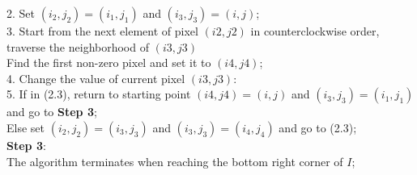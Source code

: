 \begin{algorithm}[htbp]
{    }
    2. Set $(i_2,j_2) = (i_1,j_1)$ and $(i_3,j_3) = (i,j)$;\\
    3. Start from the next element of pixel $(i2,j2)$ in counterclockwise order, traverse the neighborhood of $(i3,j3)$\\
    Find the first non-zero pixel and set it to $(i4,j4)$;\\
    4. Change the value of current pixel $(i3,j3)$:\\
    5. If in (2.3), return to starting point $(i4,j4) = (i,j)$ and $(i_3,j_3) = (i_1,j_1)$ and go to \textbf{Step 3};\\
    Else set $(i_2,j_2) = (i_3,j_3)$ and $(i_3,j_3) = (i_4,j_4)$ and go to (2.3);\\
    \vspace{\baselineskip}
    \textbf{Step 3}:\\
    The algorithm terminates when reaching the bottom right corner of $I$;\\
\end{algorithm}
